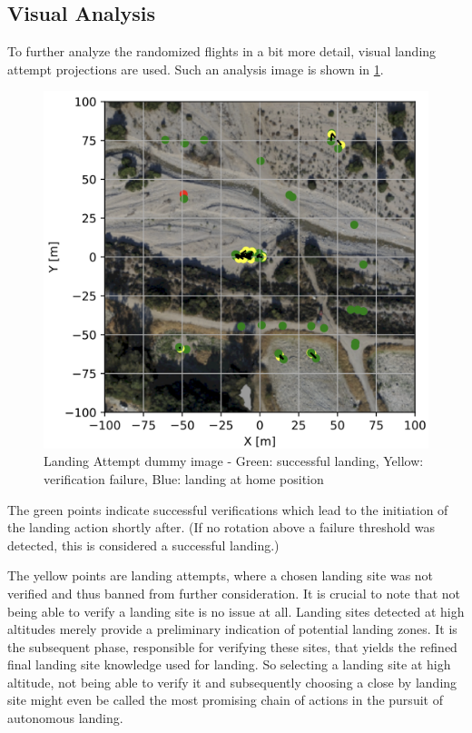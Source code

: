 \subsection{Visual Analysis}
To further analyze the randomized flights in a bit more detail, visual landing attempt projections are used. Such an analysis image is shown in \cref{fig:landing_attempts_dummy}.

\begin{figure}[h]
    \begin{center}
        \includegraphics[scale=0.5]{images/evaluation/landings_random_WP_GT.png}
        \caption{Landing Attempt dummy image - Green: successful landing, Yellow: verification failure, Blue: landing at home position}
        \label{fig:landing_attempts_dummy}
    \end{center}
\end{figure}

The green points indicate successful verifications which lead to the initiation of the landing action shortly after. (If no rotation above a failure threshold was detected, this is considered a successful landing.) 

The yellow points are landing attempts, where a chosen landing site was not verified and thus banned from further consideration. It is crucial to note that not being able to verify a landing site is no issue at all. Landing sites detected at high altitudes merely provide a preliminary indication of potential landing zones. It is the subsequent phase, responsible for verifying these sites, that yields the refined final landing site knowledge used for landing. So selecting a landing site at high altitude, not being able to verify it and subsequently choosing a close by landing site might even be called the most promising chain of actions in the pursuit of autonomous landing.

